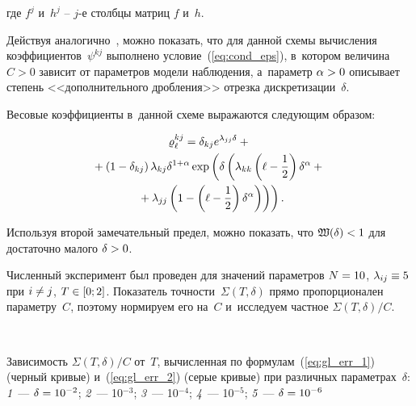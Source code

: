 \begin{multicols}{2}
 \vspace*{-3pt}
 
 \noindent
 где $f^j$ и~$h^j$ -- $j$-е столбцы матриц $f$ и~$h$.

 Действуя аналогично~\cite{B_20_2_ARC}, можно показать, что для данной схемы 
вы\-чис\-ле\-ния коэффициентов~$\psi^{kj}$ выполнено условие~(\ref{eq:cond_eps}), 
в~котором величина
$C>0$ зависит от па\-ра\-мет\-ров модели наблюдения, а~параметр $\alpha\hm>0$  описывает 
степень <<дополнительного дроб\-ле\-ния>> отрезка дискретизации~$\delta$.

 Весовые коэффициенты в~данной схеме выражаются сле\-ду\-ющим образом:
 
\vspace*{-5pt}

\noindent
\begin{multline*}
 \varrho^{kj}_{\ell} = \delta_{kj}e^{\lambda_{jj} \delta} +{}\\
 {}+
 \left(1-\delta_{kj}\right)\lambda_{kj}  \delta^{1+\alpha}
 \exp \left(  \delta  \left(  \lambda_{kk}\left(\ell-\displaystyle\frac{\displaystyle 1\mathstrut}{\displaystyle 2\mathstrut}\right)\delta^{\alpha} +{}\right.\right.\\
\left.\left.{}+ \lambda_{jj}\left(1-\left(\ell-\displaystyle\frac{\displaystyle 1\mathstrut}{\displaystyle 2\mathstrut}\right)\delta^{\alpha}\right) \right)  \right).
\end{multline*}

\vspace*{-5pt}

 Используя второй замечательный предел, мож\-но показать, что $\mathfrak{W}(\delta) 
\hm< 1$ для до\-ста\-точ\-но малого $\delta\hm > 0$.


 Численный эксперимент был проведен для значений па\-ра\-мет\-ров $N \hm= 10$,  
$\lambda_{ij} \hm\equiv 5$ при $i \hm\neq j$, $T \hm\in [0;2]$. Показатель точ\-ности~$\Sigma (T,\delta)$ 
прямо пропорционален па\-ра\-мет\-ру~$C$, поэтому нормируем его на~$C$ и~ис\-сле\-ду\-ем част\-ное ${\Sigma (T,\delta)}/{C}$.




{ \begin{center}  %
   \mbox{%
\epsfxsize=76.664mm
}

\end{center}

\vspace*{-6pt}

\noindent
{\small Зависимость ${\Sigma (T,\delta)}/{C}$ от~$T$, вы\-чис\-лен\-ная по 
формулам~(\ref{eq:gl_err_1}) (черный кривые) и~(\ref{eq:gl_err_2}) (серые кривые) при различных па\-ра\-мет\-рах~$\delta$:
\textit{1}~--- $\delta\hm= 10^{-2}$; \textit{2}~--- 10$^{-3}$; \textit{3}~--- 10$^{-4}$; 
\textit{4}~--- 10$^{-5}$; \textit{5}~--- $\delta\hm= 10^{-6}$
}
}


\end{multicols}
